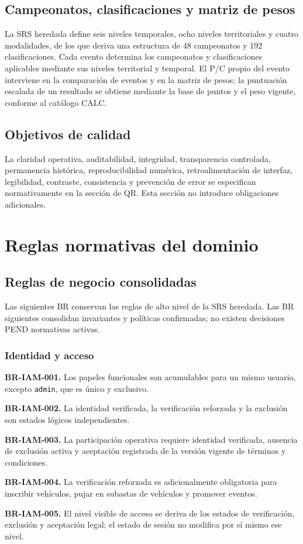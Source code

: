 \documentclass[10pt,letterpaper]{article}
\begin{document}
\subsection{Campeonatos, clasificaciones y matriz de pesos}
La SRS heredada define seis niveles temporales, ocho niveles territoriales y cuatro modalidades, de los que deriva una estructura de 48 campeonatos y 192 clasificaciones. Cada evento determina los campeonatos y clasificaciones aplicables mediante sus niveles territorial y temporal. El P/C propio del evento interviene en la comparación de eventos y en la matriz de pesos; la puntuación escalada de un resultado se obtiene mediante la base de puntos y el peso vigente, conforme al catálogo CALC.

\subsection{Objetivos de calidad}
La claridad operativa, auditabilidad, integridad, transparencia controlada, permanencia histórica, reproducibilidad numérica, retroalimentación de interfaz, legibilidad, contraste, consistencia y prevención de error se especifican normativamente en la sección de QR. Esta sección no introduce obligaciones adicionales.

\section{Reglas normativas del dominio}
\subsection{Reglas de negocio consolidadas}
Las siguientes BR conservan las reglas de alto nivel de la SRS heredada. Las BR siguientes consolidan invariantes y políticas confirmadas; no existen decisiones PEND normativas activas.

\subsubsection{Identidad y acceso}
\noindent\textbf{BR-IAM-001.} Los papeles funcionales son acumulables para un mismo usuario, excepto \texttt{admin}, que es único y exclusivo.\par
\noindent\textbf{BR-IAM-002.} La identidad verificada, la verificación reforzada y la exclusión son estados lógicos independientes.\par
\noindent\textbf{BR-IAM-003.} La participación operativa requiere identidad verificada, ausencia de exclusión activa y aceptación registrada de la versión vigente de términos y condiciones.\par
\noindent\textbf{BR-IAM-004.} La verificación reforzada es adicionalmente obligatoria para inscribir vehículos, pujar en subastas de vehículos y promover eventos.\par
\noindent\textbf{BR-IAM-005.} El nivel visible de acceso se deriva de los estados de verificación, exclusión y aceptación legal; el estado de sesión no modifica por sí mismo ese nivel.\par
\end{document}
